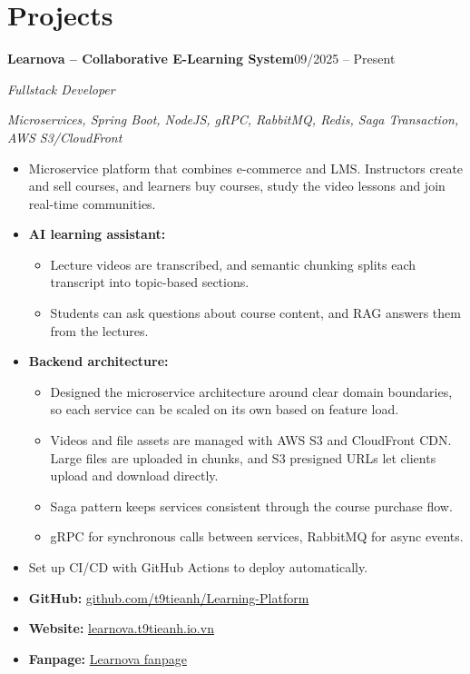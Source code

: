\documentclass[11pt,a4paper]{article}
\newcommand{\entry}[3]{%
  \textbf{#1}\hfill #2\par\vspace{3pt}
  {\itshape\color{subtle}#3}\par\vspace{1pt}}
\begin{document}
\section{Projects}
\entry{Learnova -- Collaborative E-Learning System}{09/2025 -- Present}{Fullstack Developer}
{\small\textit{Microservices, Spring Boot, NodeJS, gRPC, RabbitMQ, Redis, Saga Transaction, AWS S3/CloudFront}}\par
\begin{itemize}
  \item Microservice platform that combines e-commerce and LMS. Instructors create and sell courses, and learners buy courses, study the video lessons and join real-time communities.
  \item \textbf{AI learning assistant:}
  \begin{itemize}
    \item Lecture videos are transcribed, and semantic chunking splits each transcript into topic-based sections.
    \item Students can ask questions about course content, and RAG answers them from the lectures.
  \end{itemize}
  \item \textbf{Backend architecture:}
  \begin{itemize}
    \item Designed the microservice architecture around clear domain boundaries, so each service can be scaled on its own based on feature load.
    \item Videos and file assets are managed with AWS S3 and CloudFront CDN. Large files are uploaded in chunks, and S3 presigned URLs let clients upload and download directly.
    \item Saga pattern keeps services consistent through the course purchase flow.
    \item gRPC for synchronous calls between services, RabbitMQ for async events.
  \end{itemize}
  \item Set up CI/CD with GitHub Actions to deploy automatically.
  \item \textbf{GitHub:} \href{https://github.com/t9tieanh/Learning-Platform}{github.com/t9tieanh/Learning-Platform}
  \item \textbf{Website:} \href{https://learnova.t9tieanh.io.vn/}{learnova.t9tieanh.io.vn}
  \item \textbf{Fanpage:} \href{https://www.facebook.com/profile.php?id=61569020296267}{Learnova fanpage}
\end{itemize}
\end{document}
